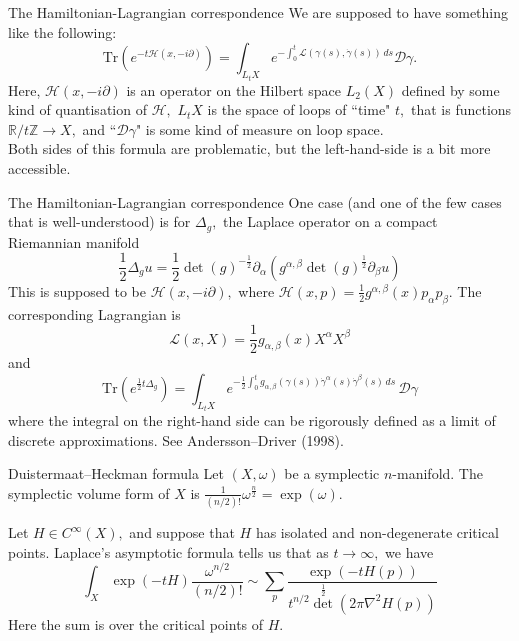 \documentclass{beamer}
\numberwithin{equation}{section}
\theoremstyle{plain}
\theoremstyle{plain}
\theoremstyle{definition}
\theoremstyle{plain}
\theoremstyle{plain}
\theoremstyle{definition}
\newcommand{\Rl}{\mathbb{R}}
\newcommand{\Itgr}{\mathbb{Z}}
\newcommand{\Dc}{\mathcal{D}}
\newcommand{\Hc}{\mathcal{H}}
\newcommand{\Lc}{\mathcal{L}}
\newcommand{\Tr}{\mathrm{Tr}}
\begin{document}
\begin{frame}{The Hamiltonian-Lagrangian correspondence}
  We are supposed to have something like the following:
  \begin{equation}
    \Tr(e^{-t\Hc(x,-i\partial)}) = \int_{L_tX} e^{-\int_0^t \Lc(\gamma(s),\dot{\gamma}(s))\,ds} \Dc \gamma.
  \end{equation}
  Here, $\Hc(x,-i\partial)$ is an operator on the Hilbert space $L_2(X)$ defined by some kind of quantisation of $\Hc,$ $L_tX$ is the space of loops of ``time" $t,$ that is functions $\Rl/t\Itgr \to X,$ and ``$\Dc\gamma$" is some kind of measure on loop space.\\
  
  \pause
  Both sides of this formula are problematic, but the left-hand-side is a bit more accessible. 
\end{frame}

\begin{frame}{The Hamiltonian-Lagrangian correspondence}
  One case (and one of the few cases that is well-understood) is for $\Delta_g,$ the Laplace operator on a compact Riemannian manifold
  \[
    \frac12\Delta_gu = \frac12\det(g)^{-\frac12}\partial_{\alpha}(g^{\alpha,\beta}\det(g)^{\frac12}\partial_{\beta}u)
  \]
  This is supposed to be $\Hc(x,-i\partial),$ where $\Hc(x,p) = \frac12 g^{\alpha,\beta}(x)p_{\alpha}p_{\beta}.$ The corresponding Lagrangian is
  \[
    \Lc(x,X) = \frac12 g_{\alpha,\beta}(x)X^{\alpha}X^{\beta}
  \]
  and
  \[
    \Tr(e^{\frac12 t\Delta_g}) = \int_{L_tX} e^{-\frac{1}{2}\int_0^t g_{\alpha,\beta}(\gamma(s))\dot{\gamma}^{\alpha}(s)\dot{\gamma}^\beta(s)\,ds}\, \Dc \gamma
  \]
  where the integral on the right-hand side can be rigorously defined as a limit of discrete approximations. See Andersson--Driver (1998).
\end{frame}

\begin{frame}{Duistermaat--Heckman formula}
  Let $(X,\omega)$ be a symplectic $n$-manifold. The symplectic volume form of $X$ is $\frac{1}{(n/2)!}\omega^{\frac{n}{2}} = \exp(\omega).$

  Let $H\in C^\infty(X),$ and suppose that $H$ has isolated and non-degenerate critical points. Laplace's asymptotic formula tells us that as $t\to\infty,$ we have
  \[
    \int_{X} \exp(-tH) \frac{\omega^{n/2}}{(n/2)!} \sim \sum_{p} \frac{\exp(-tH(p))}{t^{n/2}\det^{\frac12}(2\pi \nabla^2 H(p))}
  \]
  Here the sum is over the critical points of $H.$
\end{frame}
\end{document}
